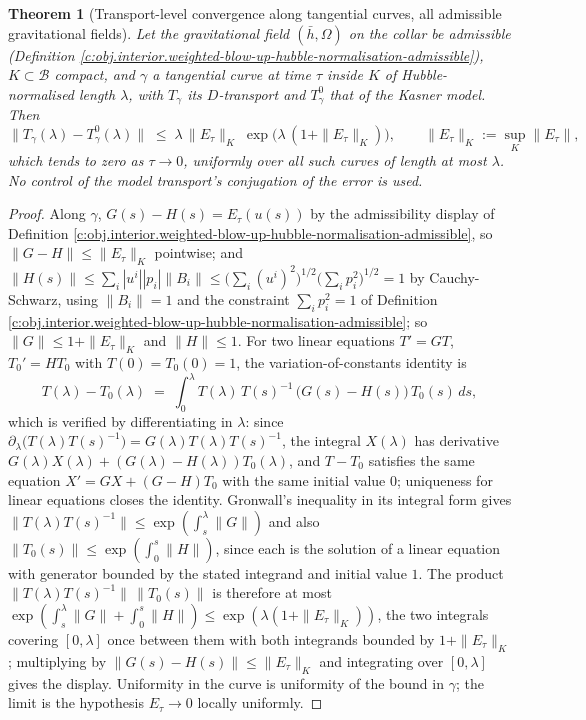 \documentclass[11pt]{article}
\newtheorem{theorem}{Theorem}[section]
\theoremstyle{definition}
\theoremstyle{plain}
\newcommand{\changedmark}[2]{\marginpar{\raggedright\scriptsize\color{#1}#2}}
\providecommand{\hb}{}\renewcommand{\hb}{\bar{h}}
\begin{document}
\begin{theorem}[Transport-level convergence along tangential curves, all admissible gravitational fields]\label{c:interior.transport-level-convergence-along-tangential-curves}
\changedmark{gray}{reworded}
Let the gravitational field $(\hb, \Omega)$ on the collar be admissible (Definition \ref{c:obj.interior.weighted-blow-up-hubble-normalisation-admissible}), $K \subset \mathcal{B}$ compact, and $\gamma$ a tangential curve at time $\tau$ inside $K$ of Hubble-normalised length $\lambda$, with $T_\gamma$ its $D$-transport and $T^0_\gamma$ that of the Kasner model. Then
\[
\|T_{\gamma}(\lambda) - T^{0}_{\gamma}(\lambda)\| \;\le\; \lambda\, \|E_{\tau}\|_{K}\; \exp\bigl(\lambda\,(1 + \|E_{\tau}\|_{K})\bigr),
\qquad \|E_{\tau}\|_{K} := \sup_{K}\|E_{\tau}\| ,
\]
which tends to zero as $\tau \to 0$, uniformly over all such curves of length at most $\lambda$. No control of the model transport's conjugation of the error is used.
\end{theorem}
\begin{proof}
Along $\gamma$, $G(s) - H(s) = E_{\tau}(u(s))$ by the admissibility display of Definition \ref{c:obj.interior.weighted-blow-up-hubble-normalisation-admissible}, so $\|G - H\| \le \|E_{\tau}\|_{K}$ pointwise; and $\|H(s)\| \le \sum_{i} |u^{i}| |p_{i}| \|B_{i}\| \le \bigl(\sum_i (u^{i})^{2}\bigr)^{1/2} \bigl(\sum_i p_{i}^{2}\bigr)^{1/2} = 1$ by Cauchy-Schwarz, using $\|B_i\| = 1$ and the constraint $\sum_i p_{i}^{2} = 1$ of Definition \ref{c:obj.interior.weighted-blow-up-hubble-normalisation-admissible}; so $\|G\| \le 1 + \|E_{\tau}\|_{K}$ and $\|H\| \le 1$. For two linear equations $T' = GT$, $T_{0}' = HT_{0}$ with $T(0) = T_{0}(0) = 1$, the variation-of-constants identity is
\[
T(\lambda) - T_{0}(\lambda) \;=\; \int_{0}^{\lambda} T(\lambda)\,T(s)^{-1}\,\bigl(G(s) - H(s)\bigr)\,T_{0}(s)\,ds ,
\]
which is verified by differentiating in $\lambda$: since $\partial_{\lambda}\bigl(T(\lambda)T(s)^{-1}\bigr) = G(\lambda)T(\lambda)T(s)^{-1}$, the integral $X(\lambda)$ has derivative $G(\lambda)X(\lambda) + (G(\lambda) - H(\lambda))T_{0}(\lambda)$, and $T - T_{0}$ satisfies the same equation $X' = GX + (G - H)T_{0}$ with the same initial value $0$; uniqueness for linear equations closes the identity. Gronwall's inequality in its integral form gives $\|T(\lambda)T(s)^{-1}\| \le \exp(\int_{s}^{\lambda}\|G\|)$ and also $\|T_{0}(s)\| \le \exp(\int_{0}^{s}\|H\|)$, since each is the solution of a linear equation with generator bounded by the stated integrand and initial value $1$. The product $\|T(\lambda)T(s)^{-1}\|\,\|T_{0}(s)\|$ is therefore at most $\exp(\int_{s}^{\lambda}\|G\| + \int_{0}^{s}\|H\|) \le \exp(\lambda(1 + \|E_{\tau}\|_{K}))$, the two integrals covering $[0, \lambda]$ once between them with both integrands bounded by $1 + \|E_{\tau}\|_{K}$; multiplying by $\|G(s) - H(s)\| \le \|E_{\tau}\|_{K}$ and integrating over $[0, \lambda]$ gives the display. Uniformity in the curve is uniformity of the bound in $\gamma$; the limit is the hypothesis $E_{\tau} \to 0$ locally uniformly.

\end{proof}
\end{document}
